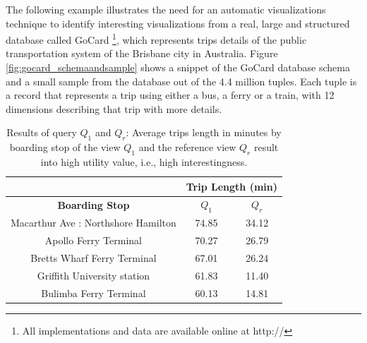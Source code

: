 The following example illustrates the need for an automatic visualizations technique to identify interesting visualizations from a real, large and structured database called GoCard \footnote{All implementations and data are available online at http://}, which represents trips details of the public transportation system of the Brisbane city in Australia.
%
Figure \ref{fig:gocard_schemaandsample} shows a snippet of the GoCard database schema and a small sample from the database out of the 4.4 million tuples.
%
Each tuple is a record that represents a trip using either a bus, a ferry or a train, with 12 dimensions describing that trip with more details.
%
%
%
\begin{table}[t]
\centering
\caption{Results of query $Q_1$ and $Q_r$: Average trips length in minutes by boarding stop of the view $Q_1$ and the reference view $Q_r$ result into high utility value, i.e., high interestingness. }{
\begin{tabular}{|c|c|c|} \hline
& \multicolumn{2}{|c|}{\textbf{Trip Length (min)}}  \\ \hline
\textbf{Boarding Stop} & $Q_1$ & $Q_r$ \\ \hline
	Macarthur Ave : Northshore Hamilton & 74.85 &  34.12\\ \hline
Apollo Ferry Terminal & 70.27 & 26.79\\ \hline
Bretts Wharf Ferry Terminal & 67.01 & 26.24 \\ \hline
Griffith University station  & 61.83 & 11.40\\ \hline
Bulimba Ferry Terminal  & 60.13 & 14.81\\ \hline
\end{tabular}}
\label{tab:q1_result}
\end{table}
%
%
%
%
%
